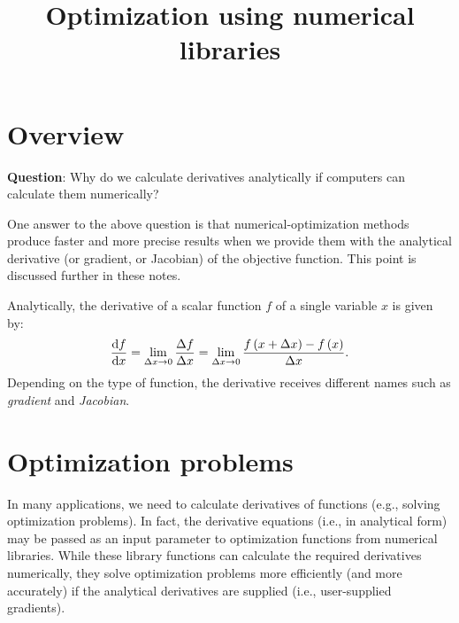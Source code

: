 \documentclass[12pt,letter]{article}
\title{{\bf Optimization using numerical libraries} }
\date{}
\begin{document}
\maketitle
\vspace{-1.0in}





\section{Overview}
\vspace{12pt}
    \begin{mdframed}[backgroundcolor=blue!20] 
        {\bf Question}: Why do we calculate derivatives analytically if computers can calculate them numerically?
    \end{mdframed}
    
One answer to the above question is that numerical-optimization methods produce faster and more precise results when we provide them with the analytical derivative (or gradient, or Jacobian) of the objective function.  This point is discussed further in these notes. 

Analytically, the derivative of a scalar function $f$  of a single variable $x$ is given by: 
\begin{align}
        \dv{f}{x} = \lim_{\Delta x \rightarrow 0}\frac{\Delta f}{\Delta x} = \lim_{\Delta x \rightarrow 0}\frac{f\left(x+\Delta x\right) - f\left(x\right)}{\Delta x}.
	\label{dfx}
\end{align}	
Depending on the type of function, the derivative receives different names such as {\em gradient} and {\em Jacobian}.

\section{Optimization problems}

In many applications, we need to calculate derivatives of functions (e.g., solving optimization problems). In fact, the derivative equations (i.e., in analytical form) may be passed as an input parameter to optimization functions from numerical libraries. While these library functions can calculate the required derivatives numerically, they solve optimization problems more efficiently (and more accurately) if the analytical derivatives are supplied (i.e., user-supplied gradients).
\end{document}
